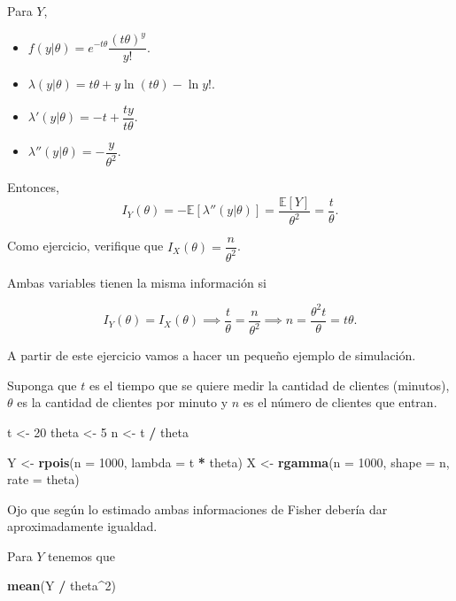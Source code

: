 \documentclass[
  12pt,
]{book}
\newenvironment{Shaded}{\begin{snugshade}}{\end{snugshade}}
\newcommand{\DataTypeTok}[1]{\textcolor[rgb]{0.13,0.29,0.53}{#1}}
\newcommand{\DecValTok}[1]{\textcolor[rgb]{0.00,0.00,0.81}{#1}}
\newcommand{\KeywordTok}[1]{\textcolor[rgb]{0.13,0.29,0.53}{\textbf{#1}}}
\newcommand{\NormalTok}[1]{#1}
\newcommand{\OperatorTok}[1]{\textcolor[rgb]{0.81,0.36,0.00}{\textbf{#1}}}
\newcommand{\StringTok}[1]{\textcolor[rgb]{0.31,0.60,0.02}{#1}}
\begin{document}
Para \(Y\),

\begin{itemize}
\item
  \(f(y|\theta) = e^{-t\theta}\dfrac{(t\theta)^y}{y!}\).
\item
  \(\lambda(y|\theta) = t\theta + y\ln (t\theta) - \ln y!\).
\item
  \(\lambda'(y|\theta) = -t+\dfrac{ty}{t\theta}.\)
\item
  \(\lambda''(y|\theta) = -\dfrac y{\theta^2}\).
\end{itemize}

Entonces,
\[I_Y(\theta) =-\mathbb E[ \lambda''(y|\theta)] = \dfrac{\mathbb E[Y]}{\theta^2} = \dfrac{t}\theta.\]

Como ejercicio, verifique que \(I_X(\theta) = \dfrac n{\theta^2}\).

Ambas variables tienen la misma información si

\[I_Y(\theta) = I_X(\theta) \implies \dfrac t\theta = \dfrac n{\theta^2} \implies n = \dfrac{\theta^2 t}{\theta } =  t\theta.\]

A partir de este ejercicio vamos a hacer un pequeño ejemplo de simulación.

Suponga que \(t\) es el tiempo que se quiere medir la cantidad de clientes (minutos), \(\theta\) es la cantidad de clientes por minuto y \(n\) es el número de clientes que entran.

\begin{Shaded}
\begin{Highlighting}[]
\NormalTok{t \textless{}{-}}\StringTok{ }\DecValTok{20}
\NormalTok{theta \textless{}{-}}\StringTok{ }\DecValTok{5}
\NormalTok{n \textless{}{-}}\StringTok{ }\NormalTok{t }\OperatorTok{/}\StringTok{ }\NormalTok{theta}

\NormalTok{Y \textless{}{-}}\StringTok{ }\KeywordTok{rpois}\NormalTok{(}\DataTypeTok{n =} \DecValTok{1000}\NormalTok{, }\DataTypeTok{lambda =}\NormalTok{ t }\OperatorTok{*}\StringTok{ }\NormalTok{theta)}
\NormalTok{X \textless{}{-}}\StringTok{ }\KeywordTok{rgamma}\NormalTok{(}\DataTypeTok{n =} \DecValTok{1000}\NormalTok{, }\DataTypeTok{shape =}\NormalTok{ n, }\DataTypeTok{rate =}\NormalTok{ theta)}
\end{Highlighting}
\end{Shaded}

Ojo que según lo estimado ambas informaciones de Fisher debería dar
aproximadamente igualdad.

Para \(Y\) tenemos que

\begin{Shaded}
\begin{Highlighting}[]
\KeywordTok{mean}\NormalTok{(Y }\OperatorTok{/}\StringTok{ }\NormalTok{theta}\OperatorTok{\^{}}\DecValTok{2}\NormalTok{)}
\end{Highlighting}
\end{Shaded}
\end{document}
